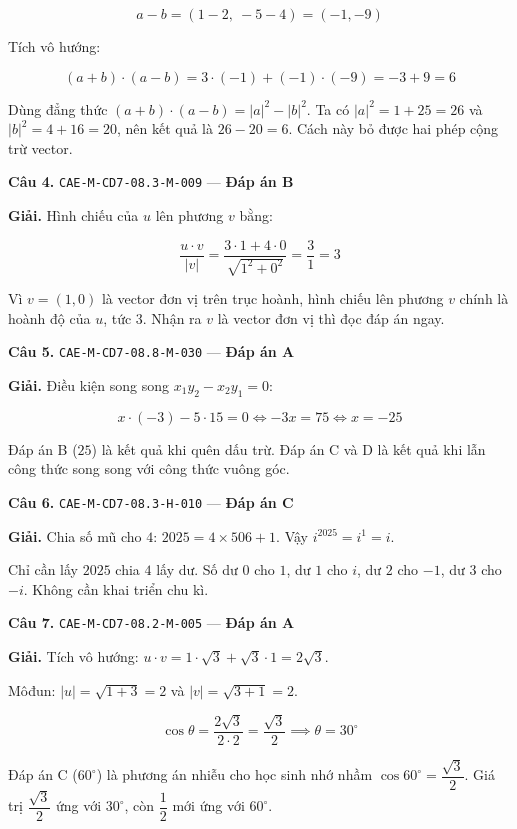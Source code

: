 \documentclass[11pt, a4paper]{article}
\begin{document}
$$a - b = (1 - 2,\ -5 - 4) = (-1, -9)$$

Tích vô hướng:

$$(a+b) \cdot (a-b) = 3 \cdot (-1) + (-1) \cdot (-9) = -3 + 9 = 6$$

 Dùng đẳng thức $(a+b) \cdot (a-b) = \lvert a \rvert^2 - \lvert b \rvert^2$. Ta có $\lvert a \rvert^2 = 1 + 25 = 26$ và $\lvert b \rvert^2 = 4 + 16 = 20$, nên kết quả là $26 - 20 = 6$. Cách này bỏ được hai phép cộng trừ vector.

\textbf{Câu 4.} \texttt{CAE-M-CD7-08.3-M-009} — \textbf{Đáp án B}

\textbf{Giải.} Hình chiếu của $u$ lên phương $v$ bằng:

$$\frac{u \cdot v}{\lvert v \rvert} = \frac{3 \cdot 1 + 4 \cdot 0}{\sqrt{1^2 + 0^2}} = \frac{3}{1} = 3$$

 Vì $v = (1,0)$ là vector đơn vị trên trục hoành, hình chiếu lên phương $v$ chính là hoành độ của $u$, tức $3$. Nhận ra $v$ là vector đơn vị thì đọc đáp án ngay.

\textbf{Câu 5.} \texttt{CAE-M-CD7-08.8-M-030} — \textbf{Đáp án A}

\textbf{Giải.} Điều kiện song song $x_1y_2 - x_2y_1 = 0$:

$$x \cdot (-3) - 5 \cdot 15 = 0 \iff -3x = 75 \iff x = -25$$

 Đáp án B ($25$) là kết quả khi quên dấu trừ. Đáp án C và D là kết quả khi lẫn công thức song song với công thức vuông góc.

\textbf{Câu 6.} \texttt{CAE-M-CD7-08.3-H-010} — \textbf{Đáp án C}

\textbf{Giải.} Chia số mũ cho $4$: $2025 = 4 \times 506 + 1$. Vậy $i^{2025} = i^{1} = i$.

 Chỉ cần lấy $2025$ chia $4$ lấy dư. Số dư $0$ cho $1$, dư $1$ cho $i$, dư $2$ cho $-1$, dư $3$ cho $-i$. Không cần khai triển chu kì.

\textbf{Câu 7.} \texttt{CAE-M-CD7-08.2-M-005} — \textbf{Đáp án A}

\textbf{Giải.} Tích vô hướng: $u \cdot v = 1 \cdot \sqrt{3} + \sqrt{3} \cdot 1 = 2\sqrt{3}$.

Môđun: $\lvert u \rvert = \sqrt{1 + 3} = 2$ và $\lvert v \rvert = \sqrt{3 + 1} = 2$.

$$\cos\theta = \frac{2\sqrt{3}}{2 \cdot 2} = \frac{\sqrt{3}}{2} \implies \theta = 30^\circ$$

 Đáp án C ($60^\circ$) là phương án nhiễu cho học sinh nhớ nhầm $\cos 60^\circ = \dfrac{\sqrt{3}}{2}$. Giá trị $\dfrac{\sqrt{3}}{2}$ ứng với $30^\circ$, còn $\dfrac{1}{2}$ mới ứng với $60^\circ$.
\end{document}
